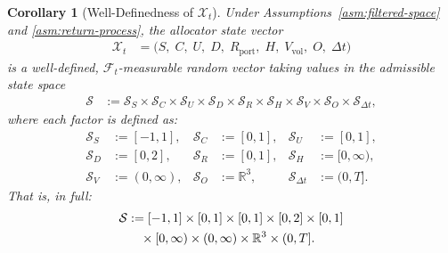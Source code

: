 \documentclass[12pt,openany]{book}
\newcommand{\calF}{\mathcal{F}}
\newcommand{\calX}{\mathcal{X}}
\numberwithin{equation}{chapter}
\theoremstyle{plain}
\newtheorem{corollary}[theorem]{Corollary}
\theoremstyle{definition}
\theoremstyle{remark}
\numberwithin{equation}{chapter}
\theoremstyle{plain}
\begin{document}
\begin{corollary}[Well-Definedness of $\calX_t$]
\label{cor:state-well-defined}
Under Assumptions~\ref{asm:filtered-space} and
\ref{asm:return-process}, the allocator state vector
\begin{align}
  \calX_t
    &= \bigl(
         S,\;
         C,\;
         U,\;
         D,\;
         R_{\mathrm{port}},\;
         H,\;
         V_{\mathrm{vol}},\;
         O,\;
         \Delta t
       \bigr)
\end{align}
is a well-defined, $\calF_t$-measurable random vector taking values
in the admissible state space
\begin{align}
  \mathcal{S}
    &:= \mathcal{S}_S
       \times \mathcal{S}_C
       \times \mathcal{S}_U
       \times \mathcal{S}_D
       \times \mathcal{S}_R
       \times \mathcal{S}_H
       \times \mathcal{S}_V
       \times \mathcal{S}_O
       \times \mathcal{S}_{\Delta t},
\end{align}
where each factor is defined as:
\begin{align}
  \mathcal{S}_S
    &:= [-1,1],
  &
  \mathcal{S}_C
    &:= [0,1],
  &
  \mathcal{S}_U
    &:= [0,1],
  \\[4pt]
  \mathcal{S}_D
    &:= [0,2],
  &
  \mathcal{S}_R
    &:= [0,1],
  &
  \mathcal{S}_H
    &:= [0,\infty),
  \\[4pt]
  \mathcal{S}_V
    &:= (0,\infty),
  &
  \mathcal{S}_O
    &:= \mathbb{R}^3,
  &
  \mathcal{S}_{\Delta t}
    &:= (0,T].
\end{align}
That is, in full:
\begin{align}
  \mathcal{S}
    &:= [-1,1]
       \times [0,1]
       \times [0,1]
       \times [0,2]
       \times [0,1]
       \notag\\
    &\quad
       \times [0,\infty)
       \times (0,\infty)
       \times \mathbb{R}^3
       \times (0,T].
\end{align}
\end{corollary}
\end{document}
